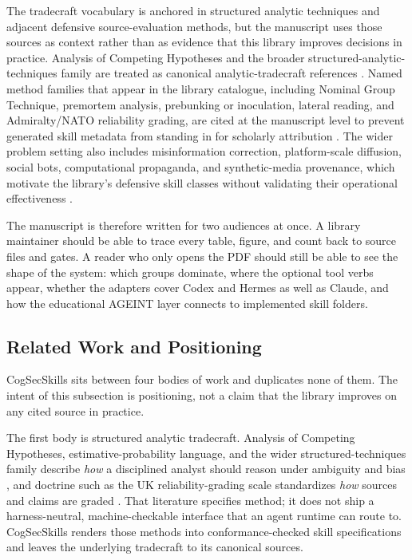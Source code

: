 \documentclass[
]{article}
\newcounter{none} %
\begin{document}
The tradecraft vocabulary is anchored in structured analytic techniques
and adjacent defensive source-evaluation methods, but the manuscript
uses those sources as context rather than as evidence that this library
improves decisions in practice. Analysis of Competing Hypotheses and the
broader structured-analytic-techniques family are treated as canonical
analytic-tradecraft references
\citep{heuer1999psychology, heuerPherson2019structured}. Named method
families that appear in the library catalogue, including Nominal Group
Technique, premortem analysis, prebunking or inoculation, lateral
reading, and Admiralty/NATO reliability grading, are cited at the
manuscript level to prevent generated skill metadata from standing in
for scholarly attribution
\citep{delbecq1971groupProcess, klein2007premortem, roozenbeek2022inoculation, wineburg2019lateralReading, ukmod2023jdp200}.
The wider problem setting also includes misinformation correction,
platform-scale diffusion, social bots, computational propaganda, and
synthetic-media provenance, which motivate the library's defensive skill
classes without validating their operational effectiveness
\citep{lewandowsky2012misinformationCorrection, vosoughi2018spread, ferrara2016socialBots, woolleyHoward2017computationalPropaganda, bradshawHoward2019globalDisinformation, mirskyLee2021deepfakes}.

The manuscript is therefore written for two audiences at once. A library
maintainer should be able to trace every table, figure, and count back
to source files and gates. A reader who only opens the PDF should still
be able to see the shape of the system: which groups dominate, where the
optional tool verbs appear, whether the adapters cover Codex and Hermes
as well as Claude, and how the educational AGEINT layer connects to
implemented skill folders.

\subsection{Related Work and
Positioning}\label{related-work-and-positioning}

CogSecSkills sits between four bodies of work and duplicates none of
them. The intent of this subsection is positioning, not a claim that the
library improves on any cited source in practice.

The first body is structured analytic tradecraft. Analysis of Competing
Hypotheses, estimative-probability language, and the wider
structured-techniques family describe \emph{how} a disciplined analyst
should reason under ambiguity and bias
\citep{heuer1999psychology, heuerPherson2019structured, kent1964estimativeProbability},
and doctrine such as the UK reliability-grading scale standardizes
\emph{how} sources and claims are graded \citep{ukmod2023jdp200}. That
literature specifies method; it does not ship a harness-neutral,
machine-checkable interface that an agent runtime can route to.
CogSecSkills renders those methods into conformance-checked skill
specifications and leaves the underlying tradecraft to its canonical
sources.
\end{document}
